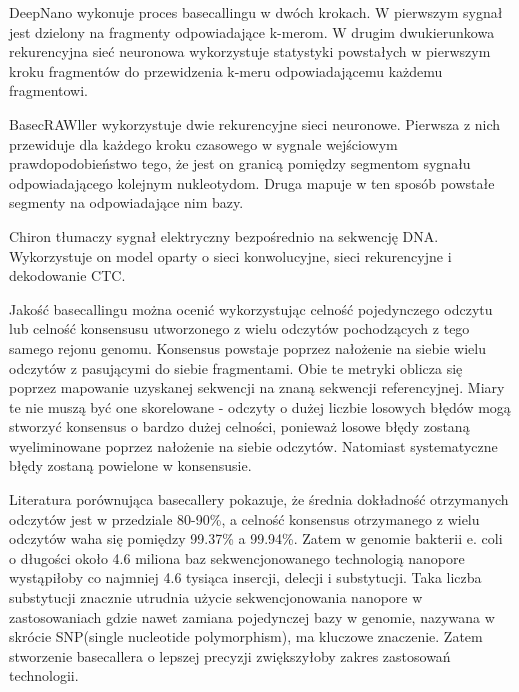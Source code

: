 \documentclass[a4paper,11pt,twoside]{report}
\theoremstyle{definition}
\begin{document}
DeepNano\cite{deepNano} wykonuje proces basecallingu w dwóch krokach. W pierwszym sygnał jest dzielony na fragmenty odpowiadające k-merom. W drugim dwukierunkowa rekurencyjna sieć neuronowa wykorzystuje statystyki powstałych w pierwszym kroku fragmentów do przewidzenia k-meru odpowiadającemu każdemu fragmentowi. 

BasecRAWller\cite{basecrawler} wykorzystuje dwie rekurencyjne sieci neuronowe. Pierwsza z nich przewiduje dla każdego kroku czasowego w sygnale wejściowym prawdopodobieństwo tego, że jest on granicą pomiędzy segmentom sygnału odpowiadającego kolejnym nukleotydom. Druga mapuje w ten sposób powstałe segmenty na odpowiadające nim bazy.

Chiron\cite{chiron} tłumaczy sygnał elektryczny bezpośrednio na sekwencję DNA. Wykorzystuje on model oparty o sieci konwolucyjne, sieci rekurencyjne i dekodowanie CTC.

Jakość basecallingu można ocenić wykorzystując celność pojedynczego odczytu lub celność konsensusu utworzonego z wielu odczytów pochodzących z tego samego rejonu genomu. Konsensus powstaje poprzez nałożenie na siebie wielu odczytów z pasującymi do siebie fragmentami. Obie te metryki oblicza się poprzez mapowanie uzyskanej sekwencji na znaną sekwencji referencyjnej. Miary te nie muszą być one skorelowane - odczyty o dużej liczbie losowych błędów mogą stworzyć konsensus o bardzo dużej celności, ponieważ losowe błędy zostaną wyeliminowane poprzez nałożenie na siebie odczytów. Natomiast systematyczne błędy zostaną powielone w konsensusie\cite{wick}.

Literatura porównująca basecallery pokazuje, że średnia dokładność otrzymanych odczytów jest w przedziale 80-90\%, a celność konsensus otrzymanego z wielu odczytów waha się pomiędzy 99.37\% a 99.94\%\cite{wick}. Zatem w genomie bakterii e. coli o długości około 4.6 miliona baz sekwencjonowanego technologią nanopore wystąpiłoby co najmniej 4.6 tysiąca insercji, delecji i substytucji. Taka liczba substytucji znacznie utrudnia użycie sekwencjonowania nanopore w zastosowaniach gdzie nawet zamiana pojedynczej bazy w genomie, nazywana w skrócie SNP(single nucleotide polymorphism), ma kluczowe znaczenie\cite{snp}. Zatem stworzenie basecallera o lepszej precyzji zwiększyłoby zakres zastosowań technologii.
\end{document}
